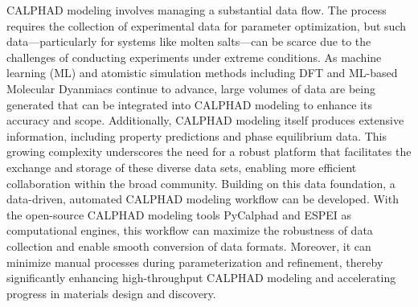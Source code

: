 CALPHAD modeling involves managing a substantial data flow. The process requires the collection of experimental data for parameter optimization, but such data—particularly for systems like molten salts—can be scarce due to the challenges of conducting experiments under extreme conditions. As machine learning (ML) and atomistic simulation methods including DFT and ML-based Molecular Dyanmiacs continue to advance, large volumes of data are being generated that can be integrated into CALPHAD modeling to enhance its accuracy and scope. Additionally, CALPHAD modeling itself produces extensive information, including property predictions and phase equilibrium data. This growing complexity underscores the need for a robust platform that facilitates the exchange and storage of these diverse data sets, enabling more efficient collaboration within the broad community. Building on this data foundation, a data-driven, automated CALPHAD modeling workflow can be developed. With the open-source CALPHAD modeling tools PyCalphad and ESPEI as computational engines, this workflow can maximize the robustness of data collection and enable smooth conversion of data formats. Moreover, it can minimize manual processes during parameterization and refinement, thereby significantly enhancing high-throughput CALPHAD modeling and accelerating progress in materials design and discovery. 

